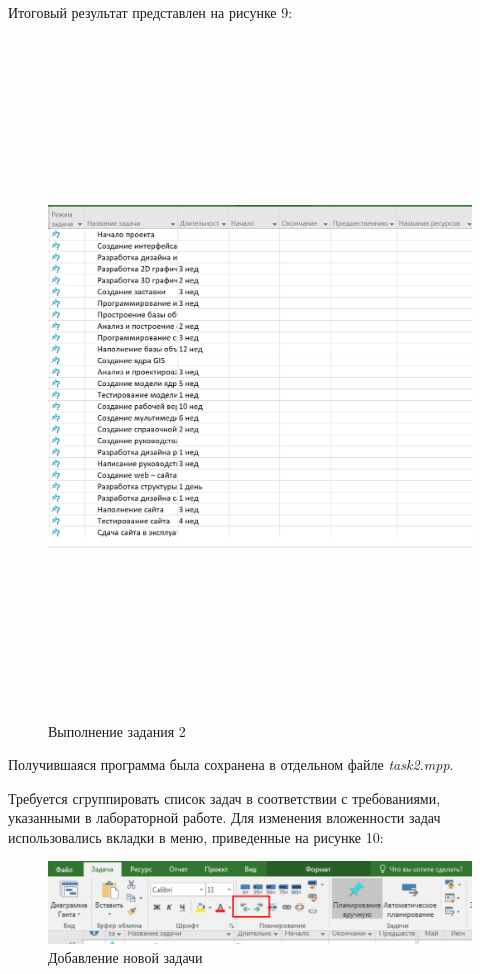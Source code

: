 Итоговый результат представлен на рисунке 9:
\FloatBarrier
\begin{figure}[h]	
	\begin{center}
		\includegraphics[height=18cm, width=\linewidth]{inc/tasks.png}
	\end{center}
	\captionsetup{justification=centering}
	\caption{Выполнение задания 2}
\end{figure}
\FloatBarrier

Получившаяся программа была сохранена в отдельном файле \textit{task2.mpp}.

Требуется сгруппировать список задач в соответствии с требованиями, указанными в лабораторной работе.
Для изменения вложенности задач использовались вкладки в меню, приведенные на рисунке 10:
\FloatBarrier
\begin{figure}[h]	
	\begin{center}
		\includegraphics[width=\linewidth]{inc/3-3.png}
	\end{center}
	\captionsetup{justification=centering}
	\caption{Добавление новой задачи}
\end{figure}
\FloatBarrier

